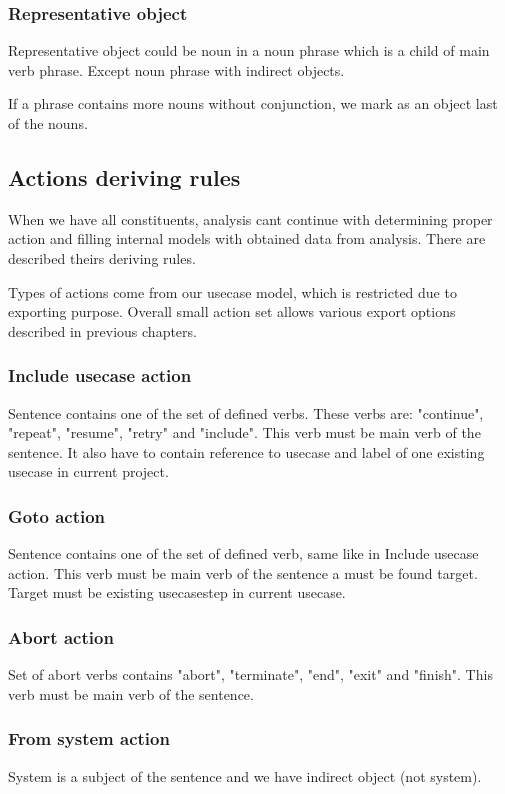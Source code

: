 \subsubsection{Representative object}
Representative object could be noun in a noun phrase which is a child of main verb phrase. Except noun phrase with indirect objects.

If a phrase contains more nouns without conjunction, we mark as an object last of the nouns.

\subsection{Actions deriving rules}
When we have all constituents, analysis cant continue with determining proper action and filling internal models with obtained data from analysis. There are described theirs deriving rules. 

Types of actions come from our usecase model, which is restricted due to exporting purpose. Overall small action set allows various export options described in previous chapters. 

\subsubsection{Include usecase action}
Sentence contains one of the set of defined verbs. These verbs are: "continue", "repeat", "resume", "retry" and "include".  This verb must be main verb of the sentence. It also have to contain reference to usecase and label of one existing usecase in current project.

\subsubsection{Goto action}
Sentence contains one of the set of defined verb, same like in Include usecase action. This verb must be main verb of the sentence a must be found target. Target must be existing usecasestep in current usecase. 

\subsubsection{Abort action}
Set of abort verbs contains "abort", "terminate", "end", "exit" and "finish".  This verb must be main verb of the sentence.

\subsubsection{From system action}
System is a subject of the sentence and we have indirect object (not system).

